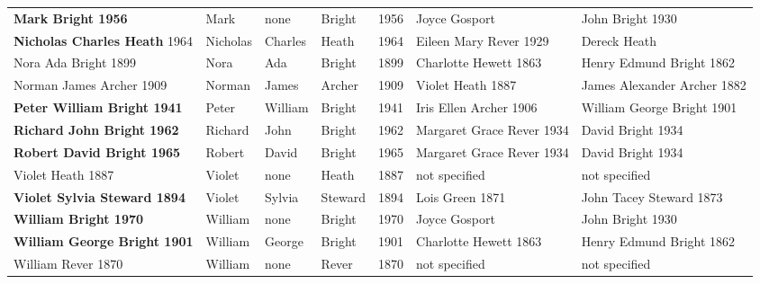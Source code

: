 \begin{landscape}
\begin{longtable}{lp{2cm}p{2cm}lp{2cm}ll}
\textbf{Mark Bright 1956} & Mark & none & Bright & 1956 & Joyce Gosport & John Bright 1930  \\
\textbf{Nicholas Charles Heath} 1964 & Nicholas & Charles & Heath & 1964 & Eileen Mary Rever 1929  & Dereck Heath \\
Nora Ada Bright 1899 & Nora & Ada & Bright & 1899 & Charlotte Hewett 1863  & Henry Edmund Bright 1862  \\
Norman James Archer 1909 & Norman & James & Archer & 1909 & Violet Heath 1887  & James Alexander Archer 1882  \\
\textbf{Peter William Bright 1941} & Peter & William & Bright & 1941 & Iris Ellen Archer 1906  & William George Bright 1901  \\
\textbf{Richard John Bright 1962} & Richard & John & Bright & 1962 & Margaret Grace Rever 1934 & David Bright 1934  \\
\textbf{Robert David Bright 1965} & Robert & David & Bright & 1965 & Margaret Grace Rever 1934 & David Bright 1934  \\
Violet Heath 1887 & Violet & none & Heath & 1887 & not specified & not specified \\
\textbf{Violet Sylvia Steward 1894} & Violet & Sylvia & Steward & 1894 & Lois Green 1871  & John Tacey Steward 1873  \\
\textbf{William Bright 1970} & William & none & Bright & 1970 & Joyce Gosport & John Bright 1930  \\
\textbf{William George Bright 1901} & William & George & Bright & 1901 & Charlotte Hewett 1863  & Henry Edmund Bright 1862  \\
William Rever 1870 & William & none & Rever & 1870 & not specified & not specified \\
\end{longtable}
\endgroup
\end{landscape}
\normalsize